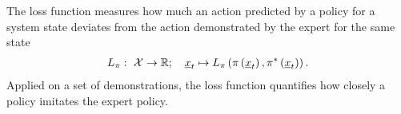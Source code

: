 

The loss function measures
how much an action 
predicted by a policy for a system state
deviates
from the action demonstrated by the expert for the same state
\begin{align}
    L_{\pi}
    :\ \mathcal{X} \rightarrow \mathbb{R}
    ;\quad
    \underline{x}_t
    \mapsto
    L_{\pi}
    \left({
        \pi\left({\underline{x}_t}\right),
        \pi^*\left({\underline{x}_t}\right)
    }\right).
\end{align}
Applied on a set of demonstrations,
the loss function quantifies how closely a policy
imitates the expert policy. 




